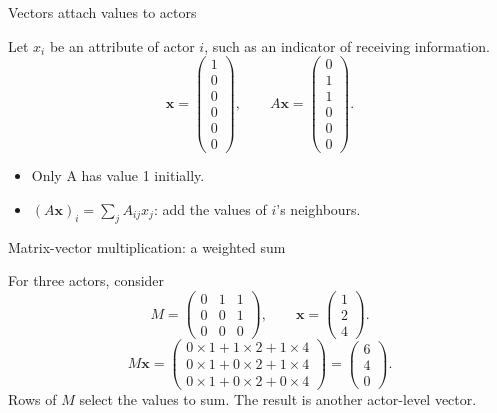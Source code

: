 \documentclass[aspectratio=169,11pt]{beamer}
\begin{document}
\begin{frame}{Vectors attach values to actors}

Let $x_i$ be an attribute of actor $i$, such as an indicator of receiving information.
\[\mathbf{x}=\begin{pmatrix}1\\0\\0\\0\\0\\0\end{pmatrix},\qquad
A\mathbf{x}=\begin{pmatrix}0\\1\\1\\0\\0\\0\end{pmatrix}.\]
\begin{itemize}
\item Only A has value 1 initially.
\item $(A\mathbf{x})_i=\sum_j A_{ij}x_j$: add the values of $i$'s neighbours.
\end{itemize}


\end{frame}

\begin{frame}{Matrix-vector multiplication: a weighted sum}

For three actors, consider
\[M=\begin{pmatrix}0&1&1\\0&0&1\\0&0&0\end{pmatrix},\qquad
\mathbf{x}=\begin{pmatrix}1\\2\\4\end{pmatrix}.\]
\[M\mathbf{x}=\begin{pmatrix}0\times1+1\times2+1\times4\\0\times1+0\times2+1\times4\\0\times1+0\times2+0\times4\end{pmatrix}
=\begin{pmatrix}6\\4\\0\end{pmatrix}.\]
Rows of $M$ select the values to sum. The result is another actor-level vector.


\end{frame}
\end{document}
